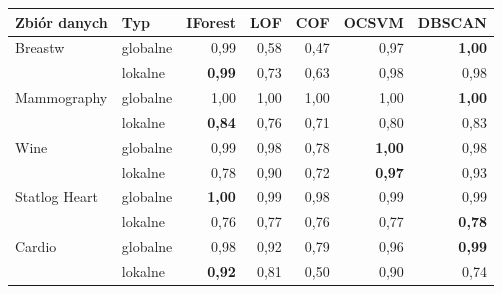 \begin{tabular}{llrrrrr}
\toprule
Zbiór danych & Typ & IForest & LOF & COF & OCSVM & DBSCAN \\
\midrule
Breastw & globalne & 0,99 & 0,58 & 0,47 & 0,97 & \textbf{1,00} \\
 & lokalne & \textbf{0,99} & 0,73 & 0,63 & 0,98 & 0,98 \\
Mammography & globalne & 1,00 & 1,00 & 1,00 & 1,00 & \textbf{1,00} \\
 & lokalne & \textbf{0,84} & 0,76 & 0,71 & 0,80 & 0,83 \\
Wine & globalne & 0,99 & 0,98 & 0,78 & \textbf{1,00} & 0,98 \\
 & lokalne & 0,78 & 0,90 & 0,72 & \textbf{0,97} & 0,93 \\
Statlog Heart & globalne & \textbf{1,00} & 0,99 & 0,98 & 0,99 & 0,99 \\
 & lokalne & 0,76 & 0,77 & 0,76 & 0,77 & \textbf{0,78} \\
Cardio & globalne & 0,98 & 0,92 & 0,79 & 0,96 & \textbf{0,99} \\
 & lokalne & \textbf{0,92} & 0,81 & 0,50 & 0,90 & 0,74 \\
\bottomrule
\end{tabular}
